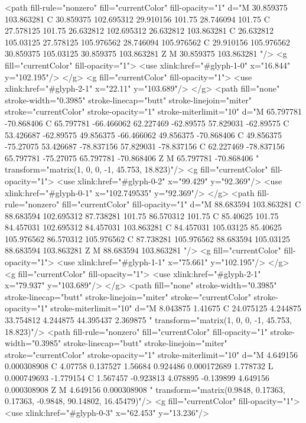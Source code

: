 <path fill-rule="nonzero" fill="currentColor" fill-opacity="1" d="M 30.859375 103.863281 C 30.859375 102.695312 29.910156 101.75 28.746094 101.75 C 27.578125 101.75 26.632812 102.695312 26.632812 103.863281 C 26.632812 105.03125 27.578125 105.976562 28.746094 105.976562 C 29.910156 105.976562 30.859375 105.03125 30.859375 103.863281 Z M 30.859375 103.863281 "/>
<g fill="currentColor" fill-opacity="1">
<use xlink:href="#glyph-1-0" x="16.844" y="102.195"/>
</g>
<g fill="currentColor" fill-opacity="1">
<use xlink:href="#glyph-2-1" x="22.11" y="103.689"/>
</g>
<path fill="none" stroke-width="0.3985" stroke-linecap="butt" stroke-linejoin="miter" stroke="currentColor" stroke-opacity="1" stroke-miterlimit="10" d="M 65.797781 -70.868406 C 65.797781 -66.466062 62.227469 -62.89575 57.829031 -62.89575 C 53.426687 -62.89575 49.856375 -66.466062 49.856375 -70.868406 C 49.856375 -75.27075 53.426687 -78.837156 57.829031 -78.837156 C 62.227469 -78.837156 65.797781 -75.27075 65.797781 -70.868406 Z M 65.797781 -70.868406 " transform="matrix(1, 0, 0, -1, 45.753, 18.823)"/>
<g fill="currentColor" fill-opacity="1">
<use xlink:href="#glyph-0-2" x="99.429" y="92.369"/>
<use xlink:href="#glyph-0-1" x="102.749535" y="92.369"/>
</g>
<path fill-rule="nonzero" fill="currentColor" fill-opacity="1" d="M 88.683594 103.863281 C 88.683594 102.695312 87.738281 101.75 86.570312 101.75 C 85.40625 101.75 84.457031 102.695312 84.457031 103.863281 C 84.457031 105.03125 85.40625 105.976562 86.570312 105.976562 C 87.738281 105.976562 88.683594 105.03125 88.683594 103.863281 Z M 88.683594 103.863281 "/>
<g fill="currentColor" fill-opacity="1">
<use xlink:href="#glyph-1-1" x="75.661" y="102.195"/>
</g>
<g fill="currentColor" fill-opacity="1">
<use xlink:href="#glyph-2-1" x="79.937" y="103.689"/>
</g>
<path fill="none" stroke-width="0.3985" stroke-linecap="butt" stroke-linejoin="miter" stroke="currentColor" stroke-opacity="1" stroke-miterlimit="10" d="M 8.043875 1.41675 C 24.075125 4.244875 33.754812 4.244875 44.395437 2.369875 " transform="matrix(1, 0, 0, -1, 45.753, 18.823)"/>
<path fill-rule="nonzero" fill="currentColor" fill-opacity="1" stroke-width="0.3985" stroke-linecap="butt" stroke-linejoin="miter" stroke="currentColor" stroke-opacity="1" stroke-miterlimit="10" d="M 4.649156 0.000308908 C 4.07758 0.137527 1.56684 0.924486 0.000172689 1.778732 L 0.000749693 -1.779154 C 1.567457 -0.923813 4.078895 -0.139899 4.649156 0.000308908 Z M 4.649156 0.000308908 " transform="matrix(0.9848, 0.17363, 0.17363, -0.9848, 90.14802, 16.45479)"/>
<g fill="currentColor" fill-opacity="1">
<use xlink:href="#glyph-0-3" x="62.453" y="13.236"/>
